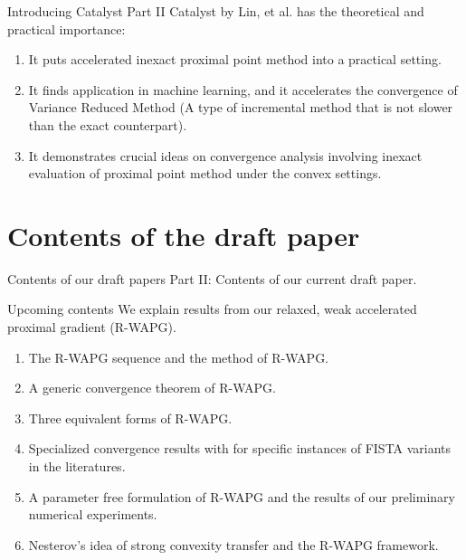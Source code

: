 \documentclass[11pt]{beamer}
\theoremstyle{definition}
\begin{document}
        \begin{frame}{Introducing Catalyst Part II}
            Catalyst by Lin, et al. \cite{lin_catalyst_2018, lin_universal_2015} has the theoretical and practical importance: 
            \begin{enumerate}
                \item It puts accelerated inexact proximal point method into a practical setting. 
                \item It finds application in machine learning, and it accelerates the convergence of Variance Reduced Method (A type of incremental method that is not slower than the exact counterpart). 
                \item It demonstrates crucial ideas on convergence analysis involving inexact evaluation of proximal point method under the convex settings. 
            \end{enumerate}
        \end{frame}

\section{Contents of the draft paper}
    \begin{frame}{Contents of our draft papers}
        Part II: Contents of our current draft paper. 
        \begin{block}{Upcoming contents}
            We explain results from our relaxed, weak accelerated proximal gradient (R-WAPG). 
            \begin{enumerate}
                \item The R-WAPG sequence and the method of R-WAPG. 
                \item A generic convergence theorem of R-WAPG. 
                \item Three equivalent forms of R-WAPG. 
                \item Specialized convergence results with for specific instances of FISTA variants in the literatures. 
                \item A parameter free formulation of R-WAPG and the results of our preliminary numerical experiments. 
                \item Nesterov's idea of strong convexity transfer and the R-WAPG framework. 
            \end{enumerate}
        \end{block}
        
    \end{frame}
\end{document}
